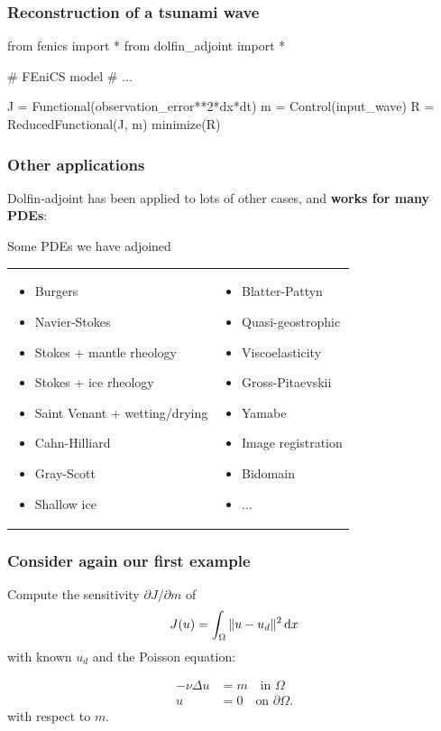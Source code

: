 \begin{frame}[fragile]
  \frametitle{Reconstruction of a tsunami wave}
  \begin{python}
from fenics import *
from dolfin_adjoint import *

# FEniCS model
# ...

J = Functional(observation_error**2*dx*dt)
m = Control(input_wave)
R = ReducedFunctional(J, m)
minimize(R)
  \end{python}
\end{frame}

\frame
{
\frametitle{Other applications}
Dolfin-adjoint has been applied to lots of other cases, and \textbf{works for many PDEs}:
\begin{block}{Some PDEs we have adjoined}
\begin{tabular}{p{}p{}}
\begin{itemize}
\item Burgers
\item Navier-Stokes
\item Stokes + mantle rheology
\item Stokes + ice rheology
\item Saint Venant + wetting/drying
\item Cahn-Hilliard
\item Gray-Scott
\item Shallow ice
\end{itemize}
&
\begin{itemize}
\item Blatter-Pattyn
\item Quasi-geostrophic
\item Viscoelasticity
\item Gross-Pitaevskii
\item Yamabe
\item Image registration
\item Bidomain
\item $\dots$
\end{itemize}
\end{tabular}
\end{block}
}

\begin{frame}
    \frametitle{Consider again our first example}

    Compute the sensitivity $\partial J/\partial m$ of
    \begin{equation*}
        J(u) = \int_\Omega \|u-u_d\|^2 \, \mathrm{d}x
    \end{equation*}
    with known $u_d$ and the Poisson equation:

    \begin{equation*}
        \begin{aligned}
            - \nu \Delta u & = m \quad \textrm{in } \Omega \\
            u &= 0 \quad \textrm{on } \partial \Omega.
        \end{aligned}
    \end{equation*}
    with respect to $m$.

\end{frame}

